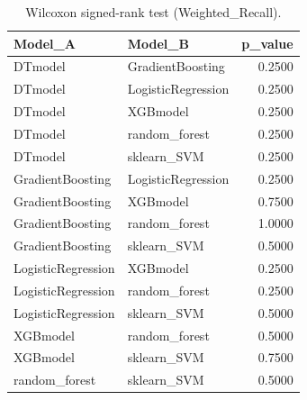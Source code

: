 \begin{table}[t]
\centering
\begin{tabular}{llr}
\toprule
Model_A & Model_B & p_value \\
\midrule
DTmodel & GradientBoosting & 0.2500 \\
DTmodel & LogisticRegression & 0.2500 \\
DTmodel & XGBmodel & 0.2500 \\
DTmodel & random_forest & 0.2500 \\
DTmodel & sklearn_SVM & 0.2500 \\
GradientBoosting & LogisticRegression & 0.2500 \\
GradientBoosting & XGBmodel & 0.7500 \\
GradientBoosting & random_forest & 1.0000 \\
GradientBoosting & sklearn_SVM & 0.5000 \\
LogisticRegression & XGBmodel & 0.2500 \\
LogisticRegression & random_forest & 0.2500 \\
LogisticRegression & sklearn_SVM & 0.5000 \\
XGBmodel & random_forest & 0.5000 \\
XGBmodel & sklearn_SVM & 0.7500 \\
random_forest & sklearn_SVM & 0.5000 \\
\bottomrule
\end{tabular}
\caption{Wilcoxon signed-rank test (Weighted_Recall).}
\label{tab:wilcoxon_Weighted_Recall}
\end{table}